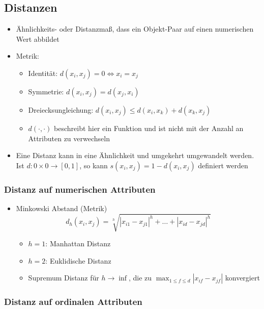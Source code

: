 \documentclass{scrartcl}
\begin{document}
\subsection{Distanzen}

\begin{itemize}
	\item Ähnlichkeits- oder Distanzmaß, dass ein Objekt-Paar auf einen 
	numerischen Wert abbildet
	\item Metrik:
	\begin{itemize}
		\item Identität: $ d(x_i,x_j) = 0 \iff x_i = x_j $
		\item Symmetrie: $ d(x_i,x_j) = d(x_j,x_i) $
		\item Dreiecksungleichung: $ d(x_i,x_j) \leq d(x_i,x_k) + d(x_k,x_j) $
		\item $ d(\cdot,\cdot) $ beschreibt hier ein Funktion und ist nicht mit 
		der Anzahl an Attributen zu verwechseln
	\end{itemize}
	\item Eine Distanz kann in eine Ähnlichkeit und umgekehrt umgewandelt 
	werden. Ist $ d: 0 \times 0 \rightarrow [0,1] $, so kann $ s(x_i,x_j) = 1 - 
	d(x_i,x_j) $ definiert werden
\end{itemize}

\subsubsection{Distanz auf numerischen Attributen}

\begin{itemize}
	\item Minkowski Abstand (Metrik)
	\[ d_h(x_i,x_j) = \sqrt[h]{|x_{i1} - x_{j1}|^h + \ldots + |x_{id} - 
	x_{jd}|^h} \]
	\begin{itemize}
		\item $ h=1 $: Manhattan Distanz
		\item $ h=2 $: Euklidische Distanz
		\item Supremum Distanz für $ h \rightarrow \inf $, die zu $ \max_{1 
		\leq f \leq d} |x_{if} - x_{jf}| $ konvergiert
	\end{itemize}
\end{itemize}

\subsubsection{Distanz auf ordinalen Attributen}
\end{document}
